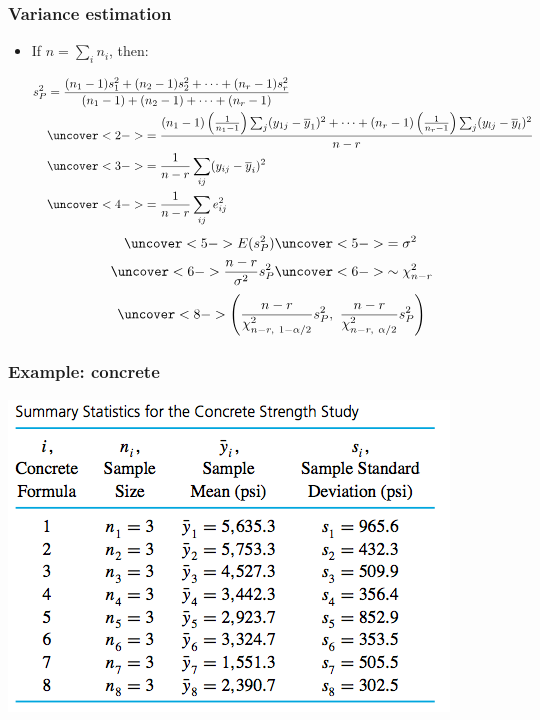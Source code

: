 \documentclass[handout]{beamer}\usepackage[]{graphicx}\usepackage[]{color}
\providecommand{\ov}[1]{\overline{#1}}
\numberwithin{equation}{section}
\begin{document}
\begin{frame}
\frametitle{Variance estimation} \scriptsize
\begin{itemize}
\item If $n = \sum_i n_i$, then:

\begin{align*}
s_P^2 &= \frac{(n_1 - 1)s_1^2 + (n_2 - 1)s_2^2 + \cdots + (n_r - 1)s_r^2}{(n_1 - 1) + (n_2 - 1) + \cdots + (n_r - 1)} \\
&\uncover<2->{= \frac{(n_1 - 1) \left (\frac{1}{n_1 - 1}\right ) \sum_j (y_{1j} - \ov{y}_1)^2 + \cdots + (n_r - 1) \left (\frac{1}{n_r - 1}\right ) \sum_j (y_{lj} - \ov{y}_l)^2}{n - r}} \\
&\uncover<3->{= \frac{1}{n-r} \sum_{ij} (y_{ij} - \ov{y}_i)^2} \\
&\uncover<4->{= \frac{1}{n - r} \sum_{ij} e_{ij}^2}
\end{align*}
\begin{align*}
\uncover<5->{E(s_P^2)} & \uncover<5->{= \sigma^2} \\
\uncover<6->{\frac{n-r}{\sigma^2} s_P^2}& \uncover<6->{ \sim \chi^2_{n - r}}
\end{align*}
\begin{align*}
\uncover<8->{\left ( \frac{n-r}{\chi^2_{n - r, \ 1 - \alpha/2}}s^2_P, \ \frac{n-r}{\chi^2_{n - r , \ \alpha/2}}s^2_P  \right )}
\end{align*}
\end{itemize}
\end{frame}

\begin{frame}
\frametitle{Example: concrete}
\begin{center}
 \includegraphics{../../fig/concindivsd.png}
\end{center}
\end{frame}
\end{document}
